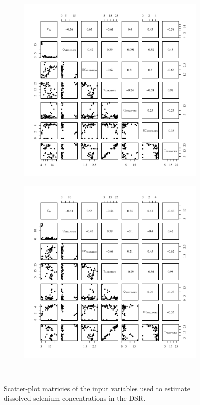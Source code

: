 \begin{landscape}
	\begin{figure}
		\begin{subfigure}{0.7\textwidth}
			\centering
			\includegraphics[width=\tableCustomSize]{"Figures/Results_DSR/Stochastic/Conc Model Full PairsD101C"}
		\end{subfigure}%
		\begin{subfigure}{0.7\textwidth}
			\centering			
			\includegraphics[width=\tableCustomSize]{"Figures/Results_DSR/Stochastic/Conc Model Full PairsD106C"}
		\end{subfigure}\\
		\caption{Scatter-plot matricies of the input variables used to estimate dissolved selenium concentrations in the DSR.}
	\end{figure}
\end{landscape}
